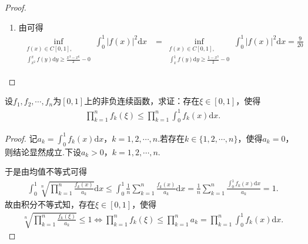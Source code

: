 \documentclass[../../main.tex]{subfiles}%
\begin{document}
\begin{proof}
\begin{enumerate}
\item 由可得
\begin{align*}
\inf_{\substack{f(x) \in C[0,1], \\ \int_{x^2}^x f(y) \mathrm{d}y \geqslant \frac{x^3 - x^6}{2} - 0}} \int_0^1 |f(x)|^2 \mathrm{d}x &= \inf_{\substack{f(x) \in C[0,1], \\ \int_x^1 f(y) \mathrm{d}y \geqslant \frac{1 - x^3}{2} - 0}} \int_0^1 |f(x)|^2 \mathrm{d}x = \frac{9}{20}
\end{align*}
\end{enumerate}

\end{proof}

\begin{example}
设$f_1,f_2,\cdots,f_n$为$[0,1]$上的非负连续函数，求证：存在$\xi \in [0,1]$，使得
\begin{align*}
\prod_{k=1}^n f_k(\xi) \leqslant \prod_{k=1}^n \int_0^1 f_k(x)\mathrm{d}x.
\end{align*}
\end{example}
\begin{proof}

记$a_k=\int_0^1 f_k(x)\mathrm{d}x$，$k=1,2,\cdots,n$.若存在$k\in \{1,2,\cdots,n\}$，使得$a_k=0$，则结论显然成立.下设$a_k>0$，$k=1,2,\cdots,n$.

于是由均值不等式可得
\begin{align*}
\int_0^1 \sqrt[n]{\prod_{k=1}^n \frac{f_k(x)}{a_k}} \mathrm{d}x \leqslant \int_0^1 \frac{1}{n}\sum_{k=1}^n \frac{f_k(x)}{a_k} \mathrm{d}x = \frac{1}{n}\sum_{k=1}^n \frac{\int_0^1 f_k(x)\mathrm{d}x}{a_k} = 1.
\end{align*}
故由积分不等式知，存在$\xi \in [0,1]$，使得
\begin{align*}
\sqrt[n]{\prod_{k=1}^n \frac{f_k(\xi)}{a_k}} \leqslant 1 \Longleftrightarrow \prod_{k=1}^n f_k(\xi) \leqslant \prod_{k=1}^n a_k = \prod_{k=1}^n \int_0^1 f_k(x)\mathrm{d}x.
\end{align*}

\end{proof}
\end{document}
